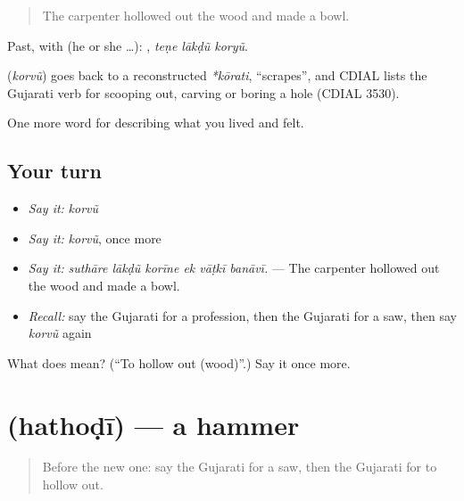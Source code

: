 \begin{quote}
The carpenter hollowed out the wood and made a bowl.
\end{quote}

Past, with  (he or she …):   , \emph{teṇe lākḍũ koryũ}.

\begin{cousinweb}
\textbf{} (\emph{korvũ}) goes back to a reconstructed \emph{*kōrati}, \textquotedblleft{}scrapes\textquotedblright{}, and CDIAL lists the Gujarati verb for scooping out, carving or boring a hole (CDIAL 3530).
\end{cousinweb}

\begin{grammarlens}[title={What you've built}]
One more word for describing what you lived and felt.
\end{grammarlens}

\subsection*{Your turn}
\begin{itemize}
\raggedright
  \item \emph{Say it:} \emph{korvũ}
  \item \emph{Say it:} \emph{korvũ}, once more
  \item \emph{Say it:} \emph{suthāre lākḍũ korīne ek vāṭkī banāvī.} — The carpenter hollowed out the wood and made a bowl.
  \item \emph{Recall:} say the Gujarati for a profession, then the Gujarati for a saw, then say \emph{korvũ} again
\end{itemize}

\begin{tcolorbox}[breakable,colback=teal!4,colframe=teal!35!black,title={Before you move on}]
What does  mean? (\textquotedblleft{}To hollow out (wood)\textquotedblright{}.) Say it once more.
\end{tcolorbox}
\section[\texorpdfstring{\gu{હથોડી} (hathoḍī)}{હથોડી (hathoḍī)}]{ (hathoḍī) — a hammer}

\label{lesson:GU-C502-hathodi}



\begin{quote}
Before the new one: say the Gujarati for a saw, then the Gujarati for to hollow out.
\end{quote}


